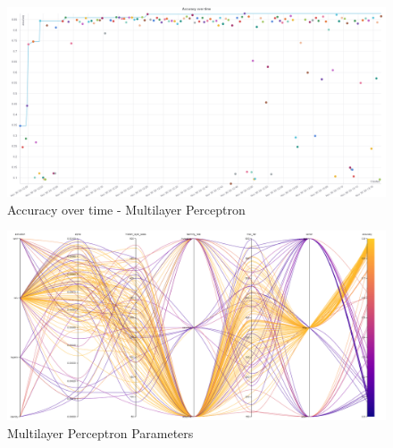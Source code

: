 \documentclass[11pt]{article}
\begin{document}
\begin{appendices}
\begin{figure}
    \caption {Accuracy over time - Multilayer Perceptron} \label{MLPAccOverTime}
    \centering
    \includegraphics[width = \textwidth, height = \textwidth, keepaspectratio]{Images/MLP Acc over time.png}
\end{figure}

\begin{figure}
  \caption {Multilayer Perceptron Parameters} \label{ParallelCoordMLP}
  \centering 
  \includegraphics[width = \textwidth, height = \textwidth, keepaspectratio]{Images/MLP ParallelCoordGraph.png}
\end{figure}

\FloatBarrier
\end{appendices}
\end{document}
